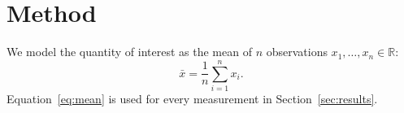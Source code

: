 \section{Method}
\label{sec:method}

We model the quantity of interest as the mean of $n$ observations
$x_1, \dots, x_n \in \mathbb{R}$:
\begin{equation}
  \bar{x} = \frac{1}{n} \sum_{i=1}^{n} x_i .
  \label{eq:mean}
\end{equation}
Equation~\eqref{eq:mean} is used for every measurement in Section~\ref{sec:results}.
